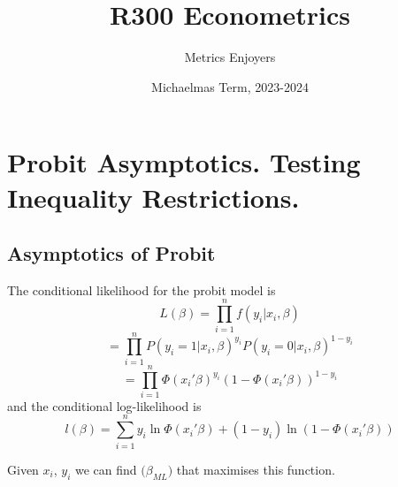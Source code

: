 \documentclass[DIV=14,titlepage=false]{scrreprt}
\title{%
R300 Econometrics}
\author{Metrics Enjoyers}
\date{Michaelmas Term, 2023-2024}
\begin{document}
\chapter{Probit Asymptotics. Testing Inequality Restrictions.}

\section{Asymptotics of Probit}

The conditional likelihood for the probit model is
\[L(\beta)=\prod_{i=1}^nf(y_i|x_i,\beta)\]
\[=\prod_{i=1}^nP(y_i=1|x_i,\beta)^{y_i}P(y_i=0|x_i,\beta)^{1-y_i}\]
\[=\prod_{i=1}^n\Phi(x_i'\beta)^{y_i}(1-\Phi(x_i'\beta))^{1-y_i}\]
and the conditional log-likelihood is
\[l(\beta)=\sum_{i=1}^ny_i\ln\Phi(x_i'\beta)+(1-y_i)\ln(1-\Phi(x_i'\beta))\]

Given \(x_i\), \(y_i\) we can find \(\hat(\beta_{ML})\) that maximises this function.
\end{document}
